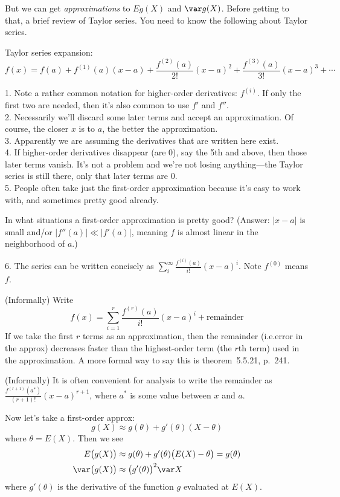 \documentclass[12pt]{article}
\begin{document}
But we can get \emph{approximations} to $E g(X)$ and $\var g(X)$.
Before getting to that, a brief review of Taylor series.
You need to know  the following about Taylor series.

\theorem Taylor series expansion:
\[
f(x)
= f(a) + f^{(1)}(a) (x - a) + \frac{f^{(2)}(a)}{2!} (x - a)^2
    + \frac{f^{(3)}(a)}{3!} (x - a)^3 + \dotsb
\]

\alert
1. Note a rather common notation for higher-order derivatives:
$f^{(i)}$. If only the first two are needed, then it's also common
to use $f'$ and $f''$.
\\
2. Necessarily we'll discard some later terms and accept an
approximation. Of course, the closer $x$ is to $a$, the better the
approximation.
\\
3. Apparently we are assuming the derivatives that are written here exist.
\\
4. If higher-order derivatives disappear (are 0), say the 5th and above,
then those later terms  vanish.
It's not a problem and we're not losing anything---the Taylor series
is still there, only that later terms are 0.
\\
5. People often take just the first-order approximation because
it's easy to work with, and sometimes pretty good already.

\exercise
In what situations a first-order approximation is pretty good?
(Answer: $|x - a|$ is small and/or $|f''(a)| \ll |f'(a)|$,
meaning $f$ is almost linear in the neighborhood of $a$.)

6. The series can be written concisely as
$\sum_{i}^{\infty} \frac{f^{(i)}(a)}{i!} (x-a)^i$.
Note $f^{(0)}$ means $f$.

\theorem
(Informally) Write
\[
f(x) = \sum_{i=1}^r \frac{f^{(r)}(a)}{i!} (x-a)^i + \text{remainder}
\]
If we take the first $r$ terms as an approximation,
then the remainder (i.e.\@ error in the approx)
decreases faster than the highest-order term
(the $r$th term) used in the approximation.
A more formal way to say this is theorem~5.5.21, p.~241.

\theorem
(Informally) It is often convenient for analysis to write
the remainder as $\frac{f^{(r+1)}(a^*)}{(r+1)!} (x - a)^{r+1}$,
where $a^*$ is some value between $x$ and $a$.
\medskip

Now let's take a first-order approx:
\[
g(X) \approx g(\theta) + g'(\theta) (X - \theta)
\]
where $\theta = E(X)$.
Then we see
\[\begin{split}
E\bigl(g(X)\bigr)
&\approx g(\theta)
    + g'(\theta)\bigl(E(X) - \theta\bigr) = g(\theta) \\
\var\bigl(g(X)\bigr) &\approx
    \bigl(g'(\theta)\bigr)^2 \var X
\end{split}
\]
where $g'(\theta)$ is the derivative of the function $g$
evaluated at $E(X)$.
\end{document}
